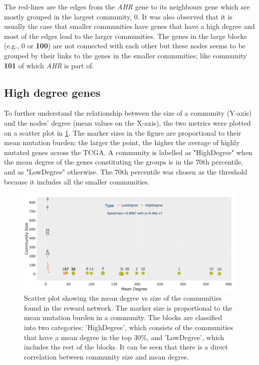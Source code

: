 The red-lines are the edges from the \textit{AHR} gene to its neighbours gene which are mostly grouped in the largest community, 0. It was also observed that it is usually the case that smaller communities have genes that have a high degree and most of the edges lead to the larger communities. The genes in the large blocks (e.g., 0 or \textbf{100}) are not connected with each other but these nodes seems to be grouped by their links to the genes in the smaller communities; like community \textbf{101} of which \textit{AHR} is part of. 


\subsection{High degree genes} \label{s:N_II:high_conn}

To further understand the relationship between the size of a community (Y-axis) and the nodes' degree (mean values on the X-axis), the two metrics were plotted on a scatter plot in \cref{fig:N_II:largeSmall_com}. The marker sizes in the figure are proportional to their mean mutation burden; the larger the point, the higher the average of highly mutated genes across the TCGA. A community is labelled as "HighDegree" when the mean degree of the genes constituting the groups is in the 70th percentile, and as "LowDegree" otherwise. The 70th percentile was chosen as the threshold because it includes all the smaller communities.


\begin{figure}[!htb]    
    \centering
    \includegraphics[width=1.0\textwidth,height=1.0\textheight,keepaspectratio]{Sections/Network_II/resources/reward/LargeSmall_com.png}
    \caption{Scatter plot showing the mean degree vs size of the communities found in the reward network. The marker size is proportional to the mean mutation burden in a community. The blocks are classified into two categories: 'HighDegree', which consists of the communities that have a mean degree in the top 30\%, and 'LowDegree', which includes the rest of the blocks. It can be seen that there is a direct correlation between community size and mean degree.}
    \label{fig:N_II:largeSmall_com}
\end{figure}

